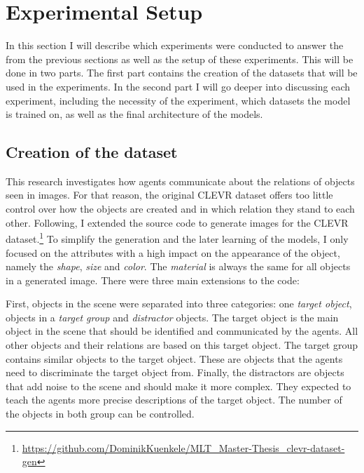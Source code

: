 \section{Experimental Setup}
\label{sec:exp-setup}


In this section I will describe which experiments were conducted to answer the  from the previous sections as well as the setup of these experiments.
This will be done in two parts.
The first part contains the creation of the datasets that will be used in the experiments.
In the second part I will go deeper into discussing each experiment, including the necessity of the experiment, which datasets the model is trained on, as well as the final architecture of the models.

\subsection{Creation of the dataset}

This research investigates how agents communicate about the relations of objects seen in images.
For that reason, the original CLEVR dataset offers too little control over how the objects are created and in which relation they stand to each other.
Following, I extended the source code to generate images for the CLEVR dataset.\footnote{\href{https://github.com/DominikKuenkele/MLT\_Master-Thesis\_clevr-dataset-gen}{https://github.com/DominikKuenkele/MLT\_Master-Thesis\_clevr-dataset-gen}}
To simplify the generation and the later learning of the models, I only focused on the attributes with a high impact on the appearance of the object, namely the \emph{shape}, \emph{size} and \emph{color}.
The \emph{material} is always the same for all objects in a generated image.
There were three main extensions to the code:

First, objects in the scene were separated into three categories: one \emph{target object}, objects in a \emph{target group} and \emph{distractor} objects.
The target object is the main object in the scene that should be identified and communicated by the agents.
All other objects and their relations are based on this target object.
The target group contains similar objects to the target object.
These are objects that the agents need to discriminate the target object from.
Finally, the distractors are objects that add noise to the scene and should make it more complex. They expected to teach the agents more precise descriptions of the target object.
The number of the objects in both group can be controlled.

